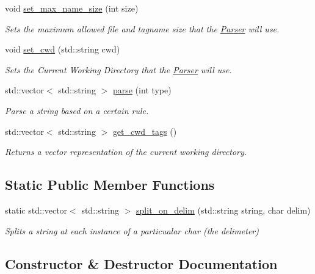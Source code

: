 \begin{DoxyCompactItemize}
void \hyperlink{classParser_ac9c3bf43a7f27f92ecf538b83c5984d6}{set\+\_\+max\+\_\+name\+\_\+size} (int size)
\begin{DoxyCompactList}\small\item\em Sets the maximum allowed file and tagname size that the \hyperlink{classParser}{Parser} will use. \end{DoxyCompactList}\item 
void \hyperlink{classParser_a086f1431a0cac193fb6ff4506ba5c701}{set\+\_\+cwd} (std\+::string cwd)
\begin{DoxyCompactList}\small\item\em Sets the Current Working Directory that the \hyperlink{classParser}{Parser} will use. \end{DoxyCompactList}\item 
std\+::vector$<$ std\+::string $>$ \hyperlink{classParser_a5b531e9ed867eeb8ccb9cb088cf35c24}{parse} (int type)
\begin{DoxyCompactList}\small\item\em Parse a string based on a certain rule. \end{DoxyCompactList}\item 
std\+::vector$<$ std\+::string $>$ \hyperlink{classParser_aa973764b863dfbe448fa2fd7aa9ffdaa}{get\+\_\+cwd\+\_\+tags} ()
\begin{DoxyCompactList}\small\item\em Returns a vector representation of the current working directory. \end{DoxyCompactList}\end{DoxyCompactItemize}
\subsection*{Static Public Member Functions}
\begin{DoxyCompactItemize}
\item 
static std\+::vector$<$ std\+::string $>$ \hyperlink{classParser_a71c87961db9707dc18db00a645d3d1e5}{split\+\_\+on\+\_\+delim} (std\+::string string, char delim)
\begin{DoxyCompactList}\small\item\em Splits a string at each instance of a particualar char (the delimeter) \end{DoxyCompactList}\end{DoxyCompactItemize}


\subsection{Constructor \& Destructor Documentation}
